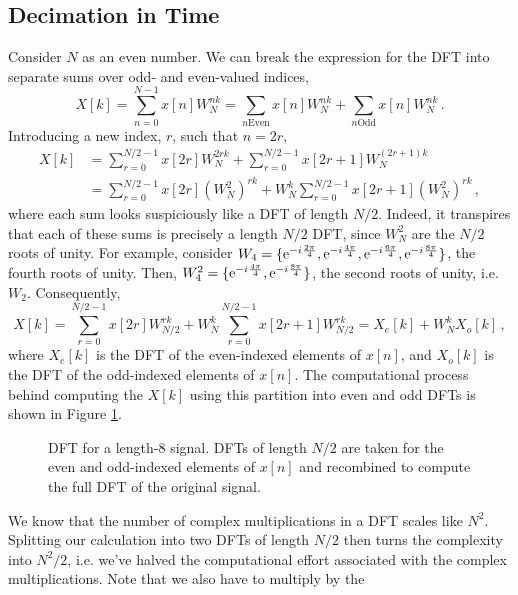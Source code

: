 \subsection{Decimation in Time}
%
Consider $N$ as an even number. We can break the expression for the DFT
into separate sums over odd- and even-valued indices,
%
\begin{displaymath}
  X[k] = \sum_{n=0}^{N-1}x[n]W_N^{nk}
  = \sum_{n \mathrm{Even}}x[n] W_N^{nk}
  + \sum_{n \mathrm{Odd}}x[n] W_N^{nk} \,.
\end{displaymath}
%
Introducing a new index, $r$, such that $n=2r$,
%
\begin{align*}
  X[k] &= \sum_{r=0}^{N/2-1} x[2r] W_N^{2rk}
  + \sum_{r=0}^{N/2-1} x[2r+1] W_N^{(2r+1)k} \\
  &= \sum_{r=0}^{N/2-1}x[2r]\left(W_N^2\right)^{rk}
  + W_N^k\sum_{r=0}^{N/2-1}x[2r+1]\left(W_N^2\right)^{rk} \,,
\end{align*}
%
where each sum looks suspiciously like a DFT of length $N/2$. Indeed,
it transpires that each of these sums is precisely a length $N/2$ DFT,
since $W_N^2$ are the $N/2$ roots of unity. For example, consider
$W_4 = \{ \mathrm{e}^{-{i\mkern1mu}\frac{2\pi}{4}}, \mathrm{e}^{-{i\mkern1mu}\frac{4\pi}{4}}, \mathrm{e}^{-{i\mkern1mu}\frac{6\pi}{4}}, \mathrm{e}^{-{i\mkern1mu}\frac{8\pi}{4}} \}$,
the fourth roots of unity. Then,
$W_4^2 = \{ \mathrm{e}^{-{i\mkern1mu}\frac{4\pi}{4}}, \mathrm{e}^{-{i\mkern1mu}\frac{8\pi}{4}} \}$, the
second roots of unity, i.e. $W_2$. Consequently,
%
\begin{displaymath}
  X[k] = 
  \sum_{r=0}^{N/2-1}x[2r] W_{N/2}^{rk}
  + W_N^k\sum_{r=0}^{N/2-1}x[2r+1] W_{N/2}^{rk}
  = X_e[k] + W_N^k X_o[k] \,,
\end{displaymath}
%
where $X_e[k]$ is the DFT of the even-indexed elements of $x[n]$,
and $X_o[k]$ is the DFT of the odd-indexed elements of $x[n]$. The
computational process behind computing the $X[k]$ using this partition
into even and odd DFTs is shown in Figure \ref{fig::lecture_11_dft_one}.
%
\begin{figure}[!htb]
  
  \caption{DFT for a length-8 signal. DFTs of length $N/2$ are taken for the
    even and odd-indexed elements of $x[n]$ and recombined to compute the full
    DFT of the original signal.
  }
  \label{fig::lecture_11_dft_one}
\end{figure}
%
We know that the number of complex multiplications in a DFT scales like $N^2$.
Splitting our calculation into two DFTs of length $N/2$ then turns the
complexity into $N^2 / 2$, i.e. we've halved the computational effort associated
with the complex multiplications. Note that we also have to multiply by the
